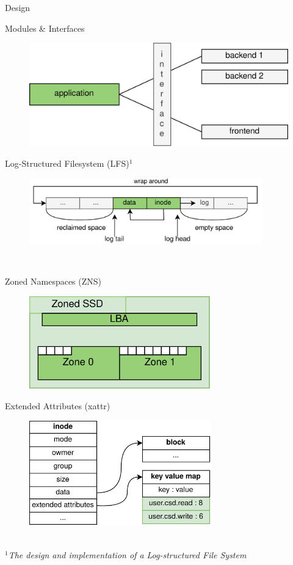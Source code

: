 \documentclass{beamer}
\newcommand\FourQuad[4]{%
    \begin{minipage}[b][.35\textheight][t]{.47\textwidth}#1\end{minipage}\hfill%
    \begin{minipage}[b][.35\textheight][t]{.47\textwidth}#2\end{minipage}\\[0.5em]
    \begin{minipage}[b][.35\textheight][t]{.47\textwidth}#3\end{minipage}\hfill
    \begin{minipage}[b][.35\textheight][t]{.47\textwidth}#4\end{minipage}%
}
\begin{document}
%
%
%
%
%
%
\begin{frame}{Design}
	\begingroup
	\small
	
	\FourQuad%
		{\centering Modules \& Interfaces
		\begin{figure}
			\centering
			\includegraphics[width=1.0\textwidth]{resources/images/modules-interfaces.png}
		\end{figure}
		}
		{\centering Log-Structured Filesystem (LFS)$^1$
		\begin{figure}
			\centering
			\includegraphics[width=0.9\textwidth]{resources/images/lfs-example.png}
		\end{figure}
		}
		{\centering Zoned Namespaces (ZNS)
		\begin{figure}
			\centering
			\includegraphics[width=0.7\textwidth]{resources/images/zns-simple.png}
		\end{figure}
		}
		{\centering Extended Attributes (xattr)
		\begin{figure}
			\centering
			\includegraphics[width=0.7\textwidth]{resources/images/xattr-inode.png}
		\end{figure}
		}
		\\
		\textit{\tiny $^{1}$The design and implementation of a Log-structured File System \\}
	\endgroup
\end{frame}
\end{document}
